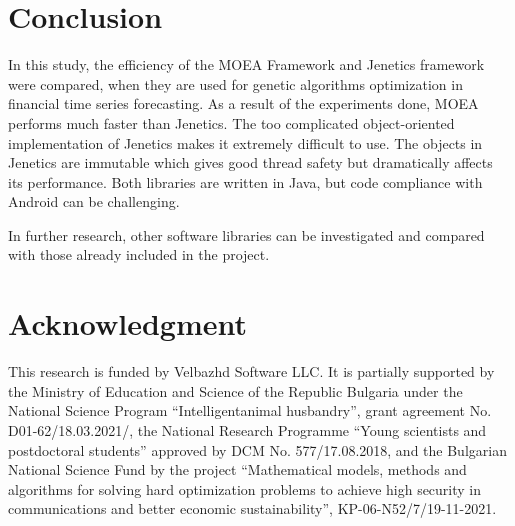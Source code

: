 \documentclass[conference]{IEEEtran}
\begin{document}
\section{Conclusion}

In this study, the efficiency of the MOEA Framework and Jenetics framework were compared, when they are used for genetic algorithms optimization in financial time series forecasting. As a result of the experiments done, MOEA performs much faster than Jenetics. The too complicated object-oriented implementation of Jenetics makes it extremely difficult to use. The objects in Jenetics are immutable which gives good thread safety but dramatically affects its performance. Both libraries are written in Java, but code compliance with Android can be challenging. 

In further research, other software libraries can be investigated and compared with those already included in the project.

\section*{Acknowledgment}

This research is funded by Velbazhd Software LLC. It is partially supported by the Ministry of Education and Science of the Republic Bulgaria under the National Science Program “Intelligentanimal husbandry”, grant agreement No. D01-62/18.03.2021/, the National Research Programme “Young scientists and postdoctoral students” approved by DCM No. 577/17.08.2018, and the Bulgarian National Science Fund by the project “Mathematical models, methods and algorithms for solving hard optimization problems to achieve high security in communications and better economic sustainability”, KP-06-N52/7/19-11-2021.


\end{document}

